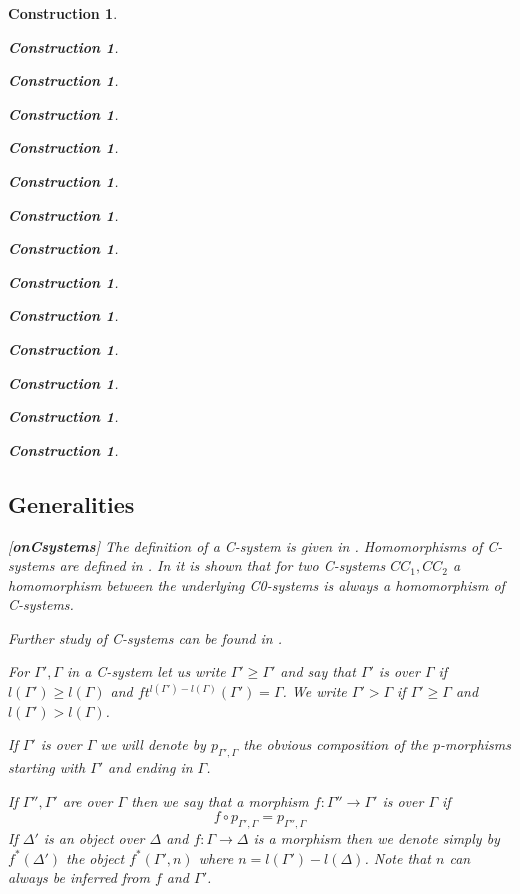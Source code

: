 \documentclass[12pt]{amsart}
\newtheorem{construction}[proposition]{Construction}
\newcommand{\llabel}[1]{\label{#1}[{\bf #1}]}
\newcommand{\sr}{\rightarrow}
\begin{document}
\begin{construction}
\begin{construction}
\begin{construction}
\begin{construction}
\begin{construction}
\begin{construction}
\begin{construction}
\begin{construction}
\begin{construction}
\begin{construction}
\begin{construction}
\begin{construction}
\begin{construction}
\begin{construction}
\subsection{Generalities}
\llabel{onCsystems}
%
The definition of a C-system is given in \cite[Def. 2.1, 2.3]{Csubsystems}. Homomorphisms of C-systems are defined in \cite[Def. 3.1, p 1188]{Cfromauniverse}. In \cite[Lemma  3.4, p. 1190]{Cfromauniverse} it is shown that for two C-systems $CC_1, CC_2$ a homomorphism between the underlying C0-systems is always a homomorphism of C-systems. 

Further study of C-systems can be found in \cite[Sec. 2, pp. 1048-1064]{fromunivwithPiI}. 

For $\Gamma',\Gamma$ in a C-system let us write $\Gamma'\ge \Gamma'$ and say that $\Gamma'$ is over $\Gamma$ if $l(\Gamma')\ge l(\Gamma)$ and $ft^{l(\Gamma')-l(\Gamma)}(\Gamma')=\Gamma$. We write $\Gamma'>\Gamma$ if $\Gamma'\ge \Gamma$ and $l(\Gamma')>l(\Gamma)$. 

If $\Gamma'$ is over $\Gamma$ we will denote by $p_{\Gamma',\Gamma}$ the obvious composition of the $p$-morphisms starting with $\Gamma'$ and ending in $\Gamma$. 

If $\Gamma'',\Gamma'$ are over $\Gamma$ then we say that a morphism $f:\Gamma''\sr \Gamma'$ is over $\Gamma$ if 
%
$$f\circ p_{\Gamma',\Gamma}=p_{\Gamma'',\Gamma}$$
%
If $\Delta'$ is an object over $\Delta$ and  $f:\Gamma\sr \Delta$ is a morphism then we denote simply by $f^*(\Delta')$ the object $f^*(\Gamma',n)$ where $n=l(\Gamma')-l(\Delta)$. Note that $n$ can always be inferred from $f$ and $\Gamma'$. 


\end{construction}
\end{construction}
\end{construction}
\end{construction}
\end{construction}
\end{construction}
\end{construction}
\end{construction}
\end{construction}
\end{construction}
\end{construction}
\end{construction}
\end{construction}
\end{construction}
\end{document}

